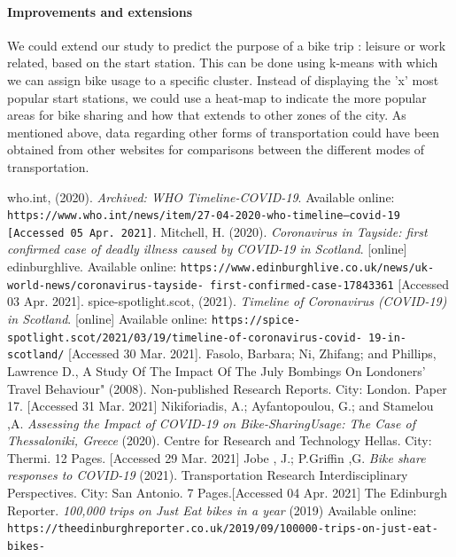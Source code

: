 \documentclass[11pt,a4paper]{article}
\begin{document}
\paragraph{Improvements and extensions}
We could extend our study to predict the purpose of a bike trip : leisure or work related, based on the start station. This can be done using k-means with which we can assign bike usage to a specific cluster. Instead of displaying the 'x' most popular start stations, we could use a heat-map to indicate the more popular areas for bike sharing and how that extends to other zones of the city. As mentioned above, data regarding other forms of transportation could have been obtained from other websites for comparisons between the different modes of transportation.



\begin{thebibliography}{9}
who.int, (2020). \textit{Archived: WHO Timeline-COVID-19}. Available online:
\texttt{https://www.who.int/news/item/27-04-2020-who-timeline---covid-19 [Accessed 05 Apr. 2021]}.
Mitchell, H. (2020). \textit{Coronavirus in Tayside: first confirmed case of deadly illness caused by COVID-19 in Scotland}. [online] edinburghlive. Available online: \texttt{https://www.edinburghlive.co.uk/news/uk-world-news/coronavirus-tayside-
first-confirmed-case-17843361} [Accessed 03 Apr. 2021].
spice-spotlight.scot, (2021). \textit{Timeline of Coronavirus (COVID-19) in Scotland}. [online] Available online: \texttt{https://spice-spotlight.scot/2021/03/19/timeline-of-coronavirus-covid-
19-in-scotland/} [Accessed 30 Mar. 2021].
Fasolo, Barbara; Ni, Zhifang; and Phillips, Lawrence D., A Study Of The Impact Of The July Bombings On Londoners’ Travel Behaviour" (2008). Non-published Research Reports. City: London. Paper 17. [Accessed 31 Mar. 2021]
Nikiforiadis, A.; Ayfantopoulou, G.; and Stamelou ,A. \textit{Assessing the Impact of COVID-19 on Bike-SharingUsage: The Case of Thessaloniki, Greece} (2020). Centre for Research and Technology Hellas. City: Thermi. 12 Pages. [Accessed 29 Mar. 2021] 
Jobe , J.; P.Griffin ,G. \textit{Bike share responses to COVID-19} (2021). Transportation Research Interdisciplinary Perspectives. City: San Antonio. 7 Pages.[Accessed 04 Apr. 2021]
The Edinburgh Reporter.
\textit{100,000 trips on Just Eat bikes in a year} (2019) Available online:
\texttt{https://theedinburghreporter.co.uk/2019/09/100000-trips-on-just-eat-bikes-
}
\end{thebibliography}
\end{document}
